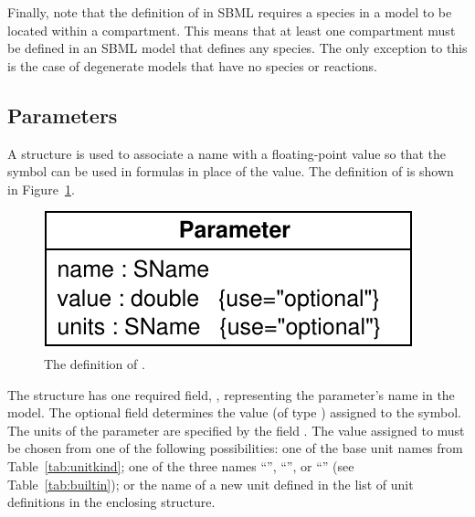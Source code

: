 \documentclass[10pt]{cekarticle}
\newcommand{\vref}[1]{\ref{#1}}
\newcommand{\changed}[1]{\textcolor{BrickRed}{#1}}
\newenvironment{blockChanged}{\color{BrickRed}}{}
\begin{document}
\begin{blockChanged}
  Finally, note that the definition of  in SBML requires a
  species in a model to be located within a compartment.  This means that
  at least one compartment must be defined in an SBML model that defines
  any species.  The only exception to this is the case of degenerate models
  that have no species or reactions.
\end{blockChanged}

\vspace*{1ex}                           %

\subsection{Parameters}
\label{sec:parameters}

A  structure is used to associate a \changed{name} with a
floating-point value so that the symbol can be used in formulas in place of
the value.  The definition of  is shown in
Figure~\vref{fig:parameter}.

\begin{figure}[htb]
  \centering
  \vspace*{8pt}
  \includegraphics[scale = 0.65]{figs/parameter}
  \caption{The definition of .}
  \label{fig:parameter}
\end{figure}

\changed{The  structure has one required field,
  \attrib{name}, representing the parameter's name in the model.}  The
\changed{optional} field  determines the value (of type
) assigned to the symbol.  The units of the parameter
 are specified by the field .  The value
assigned to  must be chosen from one of the following
possibilities: one of \changed{the} base unit names from
Table~\vref{tab:unitkind}; one of the three names
``'', ``'', or ``''
(see Table~\ref{tab:builtin}); or the name of a new unit defined in the
list of unit definitions in the enclosing  structure.
\end{document}
